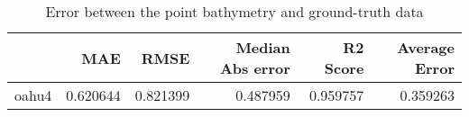 \begin{table}[h!]
\caption{Error between the point bathymetry and ground-truth data}
\label{tab:oahu4_lidar_error}
\begin{tabular}{lrrrrr}
\toprule
 & MAE & RMSE & Median Abs error & R2 Score & Average Error \\
\midrule
oahu4 & 0.620644 & 0.821399 & 0.487959 & 0.959757 & 0.359263 \\
\bottomrule
\end{tabular}
\end{table}
